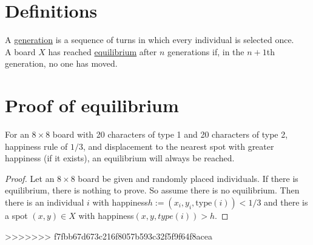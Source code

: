 \documentclass{article}
\begin{document}
\section{Definitions}
A \underline{generation} is a sequence of turns in which every individual is selected once.\\
A board $X$ has reached \underline{equilibrium} after $n$ generations if, in the $n+1$th generation, no one has moved.

\section{Proof of equilibrium}

For an $8\times 8$ board with 20 characters of type 1 and 20 characters of type 2, happiness rule of $1/3$, and displacement to the nearest spot with greater happiness (if it exists), an equilibrium will always be reached.
\begin{proof}
Let an $8\times 8$ board be given and randomly placed individuals. If there is equilibrium, there is nothing to prove. So assume there is no equilibrium. Then there is an individual $i$ with happiness$h := (x_i,y_i,\text{type}(i)) < 1/3$ and there is a spot $(x,y)\in X$ with happiness$(x,y,type(i)) > h$.
\end{proof} 
>>>>>>> f7fbb67d673c216f8057b593c32f5f9f64f8acea
\end{document}
